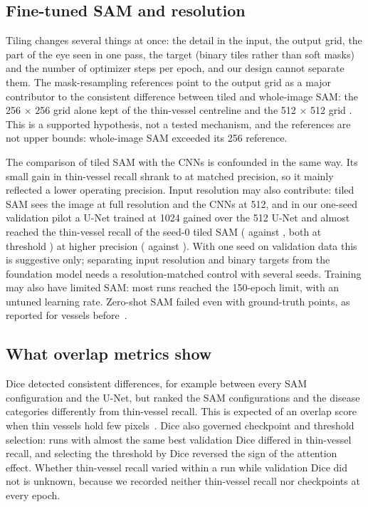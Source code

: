 \subsection*{Fine-tuned SAM and resolution}
Tiling changes several things at once: the detail in the input, the output grid, the part of the eye seen in one pass,
the target (binary tiles rather than soft masks) and the number of optimizer steps per epoch, and our design cannot
separate them. The mask-resampling references point to the output grid as a major contributor to the consistent
difference between tiled and whole-image SAM: the 256 $\times$ 256 grid alone kept \RefTwoThin{} of the thin-vessel
centreline and the 512 $\times$ 512 grid \RefFiveThin. This is a supported hypothesis, not a tested mechanism, and the
references are not upper bounds: whole-image SAM exceeded its 256 reference.

The comparison of tiled SAM with the CNNs is confounded in the same way. Its small gain in thin-vessel recall shrank to
\PHStTiledThinMatch{} at matched precision, so it mainly reflected a lower operating precision. Input resolution may
also contribute: tiled SAM sees the image at full resolution and the CNNs at 512, and in our one-seed validation
pilot a U-Net trained at 1024 gained \PilotThinGain{} over the 512 U-Net and almost reached the thin-vessel recall of the
seed-0 tiled SAM (\PilotTenThin{} against \SAMTiledValThinSeedA, both at threshold \PilotThreshold) at higher precision
(\PilotTenPrec{} against \PilotSAMTiledPrec). With one seed on validation data this is suggestive only;
separating input resolution and binary targets from the foundation model needs a resolution-matched control with several
seeds. Training may also have limited SAM: most runs reached the 150-epoch limit, with an
untuned learning rate. Zero-shot SAM failed even with
ground-truth points, as reported for vessels before~\cite{shi2023samzeroshot,qiu2023learnable}.

\subsection*{What overlap metrics show}
Dice detected consistent differences, for example between every SAM configuration and the U-Net, but ranked the SAM
configurations and the disease categories differently from thin-vessel recall. This is expected of an overlap score when
thin vessels hold few pixels~\cite{reinke2024pitfalls}. Dice also governed checkpoint and threshold
selection: runs with almost the same best validation Dice differed in thin-vessel recall, and selecting the threshold by
Dice reversed the sign of the attention effect. Whether thin-vessel
recall varied within a run while validation Dice did not is unknown, because we recorded neither thin-vessel recall nor
checkpoints at every epoch.

